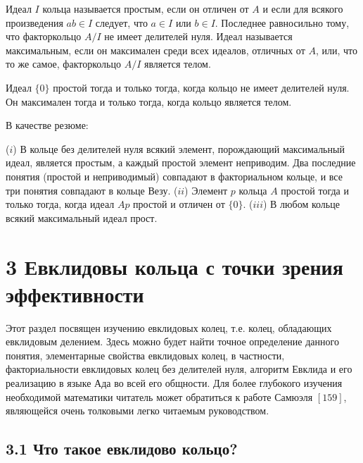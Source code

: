 \documentclass{../../template/mai_book}
\begin{document}
\begin{determ}
\textit{\indent}Идеал $I$ кольца называется простым, если он отличен от $A$ и если для всякого произведения $ab \in I$ следует, что $a \in I$ или $b \in I$. Последнее равносильно тому, что факторкольцо $A/I$ не имеет делителей нуля. \newline \indent Идеал называется максимальным, если он максимален среди всех идеалов, отличных от $A$, или, что то же самое, факторкольцо $A/I$ является телом.
\end{determ}

\begin{mynotice}
Идеал $\{0\}$ простой тогда и только тогда, когда кольцо не имеет делителей нуля. Он максимален тогда и только тогда, когда кольцо является телом.
\end{mynotice}

\newpage
\indent В качестве резюме:

\begin{predl}
\textit{\indent} ($i$) В кольце без делителей нуля всякий элемент, порождающий максимальный идеал, является простым, а каждый простой элемент неприводим. Два последние понятия (простой и неприводимый) совпадают в факториальном кольце, и все три понятия совпадают в кольце Везу. \newline \indent ($ii$) Элемент $p$ кольца $A$ простой тогда и только тогда, когда идеал $Ap$ простой и отличен от $\{0\}$. \newline \indent ($iii$) В любом кольце всякий максимальный идеал прост.
\end{predl}

\section{3 Евклидовы кольца с точки зрения эффективности}

Этот раздел посвящен изучению евклидовых колец, т.е. колец, обладающих евклидовым делением. Здесь можно будет найти точное определение данного понятия, элементарные свойства евклидовых колец, в частности, факториальности евклидовых колец без делителей нуля, алгоритм Евклида и его реализацию в языке Ада во всей его общности. Для более глубокого изучения необходимой математики читатель может обратиться к работе Самюэля $[159]$, являющейся очень толковыми легко читаемым руководством.

\subsection{3.1 Что такое евклидово кольцо?}
\end{document}
